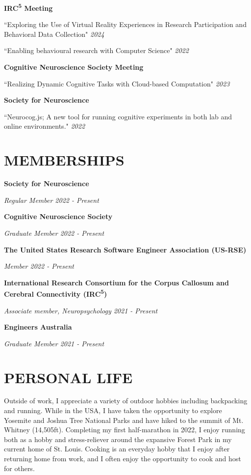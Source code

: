 \documentclass{article}
\begin{document}
  \textbf{IRC\textsuperscript{5} Meeting}

 ``Exploring the Use of Virtual Reality Experiences in Research Participation and Behavioral Data Collection" \hfill \textit{2024}

 ``Enabling behavioural research with Computer Science" \hfill \textit{2022}

  \medbreak

  \textbf{Cognitive Neuroscience Society Meeting}

  ``Realizing Dynamic Cognitive Tasks with Cloud-based Computation" \hfill \textit{2023}

  \medbreak

  \textbf{Society for Neuroscience}

  ``Neurocog.js; A new tool for running cognitive experiments in both lab and online environments." \hfill \textit{2022}

  \pagebreak

  \section*{\centering\uppercase{Memberships}}

  {\textbf{Society for Neuroscience}}

  \textit{Regular Member \hfill 2022 - Present}

  \medbreak

  {\textbf{Cognitive Neuroscience Society}}

  \textit{Graduate Member \hfill 2022 - Present}

  \medbreak

  {\textbf{The United States Research Software Engineer Association (US-RSE)}}

  \textit{Member \hfill 2022 - Present}

  \medbreak

  {\textbf{International Research Consortium for the Corpus Callosum and Cerebral Connectivity (IRC\textsuperscript{5})}}

  \textit{Associate member, Neuropsychology \hfill 2021 - Present}

  \medbreak

  {\textbf{Engineers Australia}}

  \textit{Graduate Member \hfill 2021 - Present}

  \section*{\centering\uppercase{Personal Life}}

  Outside of work, I appreciate a variety of outdoor hobbies including backpacking and running. While in the USA, I have taken the opportunity to explore Yosemite and Joshua Tree National Parks and have hiked to the summit of Mt. Whitney (14,505ft). Completing my first half-marathon in 2022, I enjoy running both as a hobby and stress-reliever around the expansive Forest Park in my current home of St. Louis. Cooking is an everyday hobby that I enjoy after returning home from work, and I often enjoy the opportunity to cook and host for others.
\end{document}
